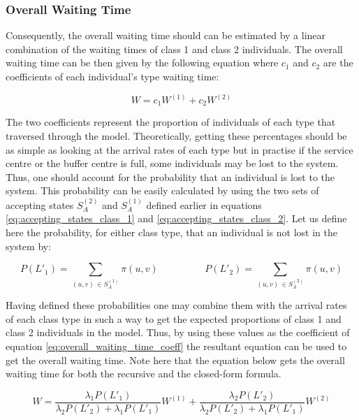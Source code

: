 \subsubsection{Overall Waiting Time}

Consequently, the overall waiting time should can be estimated by a linear combination 
of the waiting times of class 1 and class 2 individuals. 
The overall waiting time can be then given by the following equation where \(c_1\) 
and \(c_2\) are the coefficients of each individual's type waiting time:

\begin{equation}\label{eq:overall_waiting_time_coeff}
    W = c_1 W^{(1)} + c_2 W^{(2)}
\end{equation}

The two coefficients represent the proportion of individuals of each type that 
traversed through the model. 
Theoretically, getting these percentages should be as simple as looking at the arrival 
rates of each type but in practise if the service centre or the buffer centre 
is full, some individuals may be lost to the system. 
Thus, one should account for the probability that an individual is lost to the system. 
This probability can be easily calculated by using the two sets of accepting states 
\(S_A^{(2)}\) and \(S_A^{(1)}\) defined earlier in equations 
\ref{eq:accepting_states_class_1} 
and \ref{eq:accepting_states_class_2}. 
Let us define here the probability, for either class type, that an individual 
is not lost in the system by:

\begin{equation*}
    P(L'_1) = \sum_{(u,v) \, \in S_A^{(1)}} \pi(u,v) \hspace{2cm}
    P(L'_2) = \sum_{(u,v) \, \in S_A^{(2)}} \pi(u,v)
\end{equation*}

Having defined these probabilities one may combine them with the arrival rates of 
each class type in such a way to get the expected proportions of class 1 and 
class 2 individuals in the model. 
Thus, by using these values as the coefficient of equation 
\ref{eq:overall_waiting_time_coeff} 
the resultant equation can be used to get the overall waiting time. 
Note here that the equation below gets the overall waiting time for both the recursive 
and the closed-form formula.

\begin{equation}\label{eq:overall_waiting_time}
    W = \frac{\lambda_1 P(L'_1)}{\lambda_2 P(L'_2) + \lambda_1 P(L'_1)} W^{(1)} + 
    \frac{\lambda_2 P(L'_2)}{\lambda_2 P(L'_2) + \lambda_1 P(L'_1)} W^{(2)}
\end{equation}



